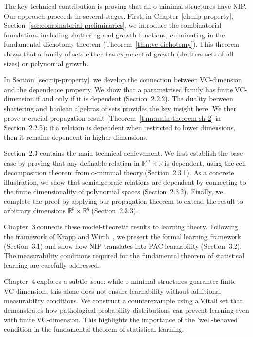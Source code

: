 The key technical contribution is proving that all o-minimal structures have NIP. Our approach proceeds in several stages. First, in Chapter~\ref{ch:nip-property}, Section~\ref{sec:combinatorial-preliminaries}, we introduce the combinatorial foundations including shattering and growth functions, culminating in the fundamental dichotomy theorem (Theorem~\ref{thm:vc-dichotomy}). This theorem shows that a family of sets either has exponential growth (shatters sets of all sizes) or polynomial growth.

In Section~\ref{sec:nip-property}, we develop the connection between VC-dimension and the dependence property. We show that a parametrised family has finite VC-dimension if and only if it is dependent (Section~2.2.2). The duality between shattering and boolean algebras of sets provides the key insight here. We then prove a crucial propagation result (Theorem~\ref{thm:main-theorem-ch-2} in Section~2.2.5): if a relation is dependent when restricted to lower dimensions, then it remains dependent in higher dimensions.

Section~2.3 contains the main technical achievement. We first establish the base case by proving that any definable relation in $\mathbb{R}^m \times \mathbb{R}$ is dependent, using the cell decomposition theorem from o-minimal theory (Section~2.3.1). As a concrete illustration, we show that semialgebraic relations are dependent by connecting to the finite dimensionality of polynomial spaces (Section~2.3.2). Finally, we complete the proof by applying our propagation theorem to extend the result to arbitrary dimensions $\mathbb{R}^p \times \mathbb{R}^q$ (Section~2.3.3).

Chapter~3 connects these model-theoretic results to learning theory. Following the framework of Krapp and Wirth~\cite{KrappWirth2021}, we present the formal learning framework (Section~3.1) and show how NIP translates into PAC learnability (Section~3.2). The measurability conditions required for the fundamental theorem of statistical learning are carefully addressed.

Chapter~4 explores a subtle issue: while o-minimal structures guarantee finite VC-dimension, this alone does not ensure learnability without additional measurability conditions. We construct a counterexample using a Vitali set that demonstrates how pathological probability distributions can prevent learning even with finite VC-dimension. This highlights the importance of the "well-behaved" condition in the fundamental theorem of statistical learning.


